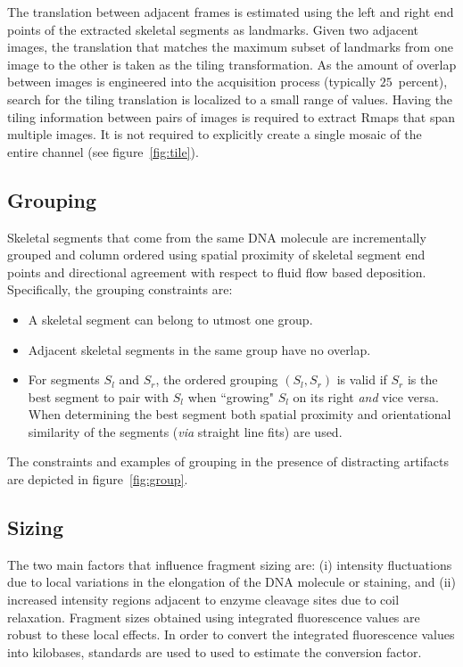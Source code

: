 \documentclass{bmcart}
\begin{document}
The translation between adjacent frames is estimated using the left and right 
end points of the extracted skeletal segments as landmarks. Given two adjacent 
images, the translation that matches the maximum subset of landmarks from one 
image to the other is taken as the tiling transformation. As the amount of 
overlap between images is engineered into the acquisition process (typically 
$25$~percent), search for the tiling translation is localized to a small 
range of values. Having the tiling information between pairs of images is 
required to extract Rmaps that span multiple images. It is not required to 
explicitly create a single mosaic of the entire channel (see 
figure~\ref{fig:tile}).  
      
\subsection*{Grouping}
Skeletal segments that come from the same DNA molecule are incrementally 
grouped and column ordered using spatial proximity of skeletal segment end 
points and directional agreement with respect to fluid flow based deposition. 
Specifically, the grouping constraints are:
\begin{itemize}
\item A skeletal segment can belong to utmost one group.
\item Adjacent skeletal segments in the same group have no overlap.
\item For segments $S_l$ and $S_r$, the ordered grouping $(S_l, S_r)$ is valid 
if $S_r$ is the best segment to pair with $S_l$ when ``growing" $S_l$ on its 
right \emph{and} vice versa. When determining the best segment both spatial 
proximity and orientational similarity of the segments (\emph{via} straight 
line fits) are used.    
\end{itemize}
The constraints and examples of grouping in the presence of distracting 
artifacts are depicted in figure~\ref{fig:group}.

\subsection*{Sizing}
The two main factors that influence fragment sizing are: (i) intensity 
fluctuations due to local variations in the elongation of the DNA molecule or staining, and (ii) increased intensity regions adjacent to enzyme cleavage 
sites due to coil relaxation. Fragment sizes obtained using integrated 
fluorescence values are robust to these local effects. In order to convert the 
integrated fluorescence values into kilobases, standards are used to used to 
estimate the conversion factor.
\end{document}
